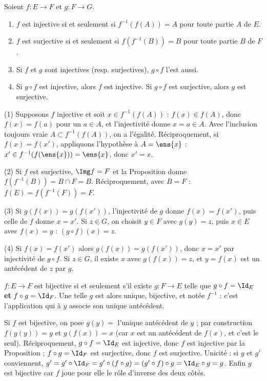 \begin{proposition}\label{prop-composition}
Soient $f:E\to F$ et $g:F\to G$.
\begin{enumerate}
\item $f$ est injective si et seulement si $f^{-1}(f(A))=A$ pour toute partie $A$ de $E$.
\item $f$ est surjective si et seulement si $f(f^{-1}(B))=B$ pour toute partie $B$ de $F$.
\item Si $f$ et $g$ sont injectives (resp. surjectives), $g\circ f$ l'est aussi.
\item Si $g\circ f$ est injective, alors $f$ est injective. Si $g\circ f$ est surjective, alors $g$ est surjective.
\end{enumerate}
\end{proposition}
\begin{preuve}
(1) Supposons $f$ injective et soit $x\in f^{-1}(f(A))$ : $f(x)\in f(A)$, donc $f(x)=f(a)$ pour un $a\in A$, et l'injectivité donne $x=a\in A$. Avec l'inclusion toujours vraie $A\subset f^{-1}(f(A))$, on a l'égalité. Réciproquement, si $f(x)=f(x')$, appliquons l'hypothèse à $A=\ens{x}$ : $x'\in f^{-1}(f(\ens{x}))=\ens{x}$, donc $x'=x$.

(2) Si $f$ est surjective, $\Img f=F$ et la Proposition  donne $f(f^{-1}(B))=B\cap F=B$. Réciproquement, avec $B=F$ : $f(E)=f(f^{-1}(F))=F$.

(3) Si $g(f(x))=g(f(x'))$, l'injectivité de $g$ donne $f(x)=f(x')$, puis celle de $f$ donne $x=x'$. Si $z\in G$, on choisit $y\in F$ avec $g(y)=z$, puis $x\in E$ avec $f(x)=y$ : $(g\circ f)(x)=z$.

(4) Si $f(x)=f(x')$ alors $g(f(x))=g(f(x'))$, donc $x=x'$ par injectivité de $g\circ f$. Si $z\in G$, il existe $x$ avec $g(f(x))=z$, et $y=f(x)$ est un antécédent de $z$ par $g$.
\end{preuve}
\begin{theoreme}\label{thm-bij}
$f:E\to F$ est bijective si et seulement s'il existe $g:F\to E$ telle que $g\circ f=\Id_E$ \textbf{et} $f\circ g=\Id_F$. Une telle $g$ est alors unique, bijective, et notée $f^{-1}$ : c'est l'application qui à $y$ associe son unique antécédent.
\end{theoreme}
\begin{preuve}
Si $f$ est bijective, on pose $g(y)=$ l'unique antécédent de $y$ ; par construction $f(g(y))=y$ et $g(f(x))=x$ (car $x$ est un antécédent de $f(x)$, et c'est le seul). Réciproquement, $g\circ f=\Id_E$ est injective, donc $f$ est injective par la Proposition  ; $f\circ g=\Id_F$ est surjective, donc $f$ est surjective. Unicité : si $g$ et $g'$ conviennent, $g'=g'\circ\Id_F=g'\circ(f\circ g)=(g'\circ f)\circ g=\Id_E\circ g=g$. Enfin $g$ est bijective car $f$ joue pour elle le rôle d'inverse des deux côtés.
\end{preuve}
